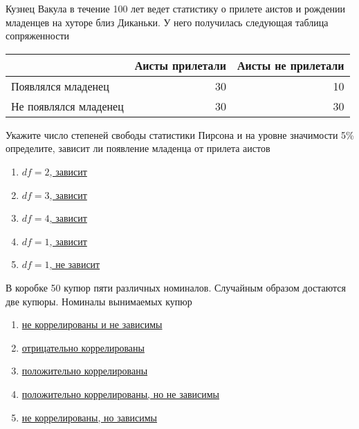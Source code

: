 \documentclass[t]{beamer}
\begin{document}
 \begin{frame} \label{26} 
\begin{block}{26} 

   Кузнец Вакула в течение 100 лет ведет статистику о прилете аистов и рождении младенцев на хуторе близ Диканьки. У него получилась следующая таблица сопряженности

\begin{center}
\begin{tabular}{lrr} \toprule
& Аисты прилетали  & Аисты не прилетали \\
\midrule
Появлялся младенец & 30 & 10 \\
Не появлялся младенец & 30 & 30 \\
\bottomrule
\end{tabular}
\end{center}

Укажите число степеней свободы статистики Пирсона и на уровне значимости 5\% определите, зависит ли появление младенца от прилета аистов

  


 \end{block} 
\begin{enumerate} 
\item[] \hyperlink{26-No}{\beamergotobutton{} $df=2$, зависит}
\item[] \hyperlink{26-No}{\beamergotobutton{} $df=3$, зависит}
\item[] \hyperlink{26-No}{\beamergotobutton{} $df=4$, зависит}
\item[] \hyperlink{26-Yes}{\beamergotobutton{} $df=1$, зависит}
\item[] \hyperlink{26-No}{\beamergotobutton{} $df=1$, не зависит}
\end{enumerate} 
\end{frame} 


 \begin{frame} \label{27} 
\begin{block}{27} 

  В коробке 50 купюр пяти различных номиналов. Случайным образом достаются две купюры. Номиналы вынимаемых купюр
  


 \end{block} 
\begin{enumerate} 
\item[] \hyperlink{27-No}{\beamergotobutton{} не коррелированы и не зависимы}
\item[] \hyperlink{27-Yes}{\beamergotobutton{} отрицательно коррелированы}
\item[] \hyperlink{27-No}{\beamergotobutton{} положительно коррелированы}
\item[] \hyperlink{27-No}{\beamergotobutton{} положительно коррелированы, но не зависимы}
\item[] \hyperlink{27-No}{\beamergotobutton{} не коррелированы, но зависимы}
\end{enumerate} 
\end{frame} 
\end{document}
